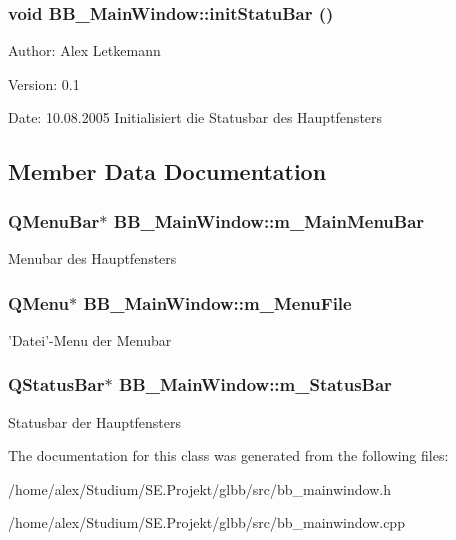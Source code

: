 \subsubsection{\setlength{\rightskip}{0pt plus 5cm}void BB\_\-Main\-Window::init\-Statu\-Bar ()}\label{classBB__MainWindow_a5}


\begin{Desc}
\item[Author:]Alex Letkemann \end{Desc}
\begin{Desc}
\item[Version:]0.1 \end{Desc}
\begin{Desc}
\item[Date:]10.08.2005 Initialisiert die Statusbar des Hauptfensters \end{Desc}


\subsection{Member Data Documentation}
\subsubsection{\setlength{\rightskip}{0pt plus 5cm}QMenu\-Bar$\ast$ {\bf BB\_\-Main\-Window::m\_\-Main\-Menu\-Bar}\hspace{0.3cm}{\tt  [protected]}}\label{classBB__MainWindow_p0}


Menubar des Hauptfensters 
\subsubsection{\setlength{\rightskip}{0pt plus 5cm}QMenu$\ast$ {\bf BB\_\-Main\-Window::m\_\-Menu\-File}\hspace{0.3cm}{\tt  [protected]}}\label{classBB__MainWindow_p1}


'Datei'-Menu der Menubar 
\subsubsection{\setlength{\rightskip}{0pt plus 5cm}QStatus\-Bar$\ast$ {\bf BB\_\-Main\-Window::m\_\-Status\-Bar}\hspace{0.3cm}{\tt  [protected]}}\label{classBB__MainWindow_p2}


Statusbar der Hauptfensters 

The documentation for this class was generated from the following files:\begin{CompactItemize}
\item 
/home/alex/Studium/SE.Projekt/glbb/src/bb\_\-mainwindow.h\item 
/home/alex/Studium/SE.Projekt/glbb/src/bb\_\-mainwindow.cpp\end{CompactItemize}
